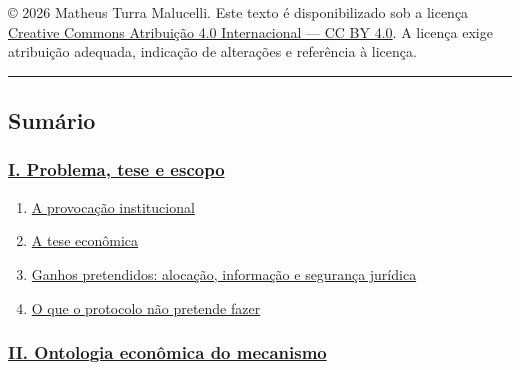 \documentclass[
  a4paper,
]{article}
\providecommand{\tightlist}{%
  \setlength{\itemsep}{0pt}\setlength{\parskip}{0pt}}
\begin{document}
© 2026 Matheus Turra Malucelli. Este texto é disponibilizado sob a
licença
\href{https://creativecommons.org/licenses/by/4.0/deed.pt-br}{Creative
Commons Atribuição 4.0 Internacional --- CC BY 4.0}. A licença exige
atribuição adequada, indicação de alterações e referência à licença.

\begin{center}\rule{0.5\linewidth}{0.5pt}\end{center}

\hypertarget{sumuxe1rio}{%
\subsection{Sumário}\label{sumuxe1rio}}

\hypertarget{i-problema-tese-e-escopo}{%
\subsubsection{\texorpdfstring{\protect\hyperlink{i-problema-tese-e-escopo}{I.
Problema, tese e
escopo}}{I. Problema, tese e escopo}}\label{i-problema-tese-e-escopo}}

\begin{enumerate}
\def\labelenumi{\arabic{enumi}.}
\tightlist
\item
  \protect\hyperlink{1-a-provocacao-institucional}{A provocação
  institucional}
\item
  \protect\hyperlink{2-a-tese-economica}{A tese econômica}
\item
  \protect\hyperlink{3-ganhos-pretendidos-alocacao-informacao-e-seguranca-juridica}{Ganhos
  pretendidos: alocação, informação e segurança jurídica}
\item
  \protect\hyperlink{4-o-que-o-protocolo-nao-pretende-fazer}{O que o
  protocolo não pretende fazer}
\end{enumerate}

\hypertarget{ii-ontologia-econuxf4mica-do-mecanismo}{%
\subsubsection{\texorpdfstring{\protect\hyperlink{ii-ontologia-economica-do-mecanismo}{II.
Ontologia econômica do
mecanismo}}{II. Ontologia econômica do mecanismo}}\label{ii-ontologia-econuxf4mica-do-mecanismo}}
\end{document}
